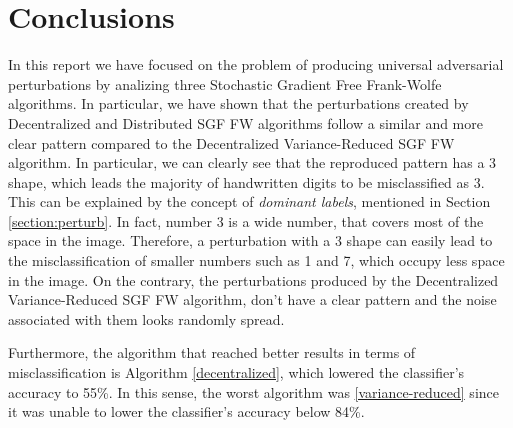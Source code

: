 \section{Conclusions}
In this report we have focused on the problem of producing universal adversarial perturbations by analizing three
Stochastic Gradient Free Frank-Wolfe algorithms. In particular, we have shown that the perturbations created by
Decentralized and Distributed SGF FW algorithms follow a similar and more clear pattern compared to the Decentralized
Variance-Reduced SGF FW algorithm. In particular, we can clearly see that the reproduced pattern has a 3 shape, which
leads the majority of handwritten digits to be misclassified as 3. This can be explained by the concept of \textit{dominant labels},
mentioned in Section \ref{section:perturb}. In fact, number 3 is a wide number, that covers most of the space in the image. Therefore, a
perturbation with a 3 shape can easily lead to the misclassification of smaller numbers such as 1 and 7, which occupy
less space in the image. On the contrary, the perturbations produced by the Decentralized Variance-Reduced SGF FW algorithm,
don't have a clear pattern and the noise associated with them looks randomly spread.

Furthermore, the algorithm that reached better results in terms of misclassification is Algorithm \ref{decentralized},
which lowered the classifier's accuracy to 55\%. In this sense, the worst algorithm was \ref{variance-reduced} since
it was unable to lower the classifier's accuracy below 84\%.


